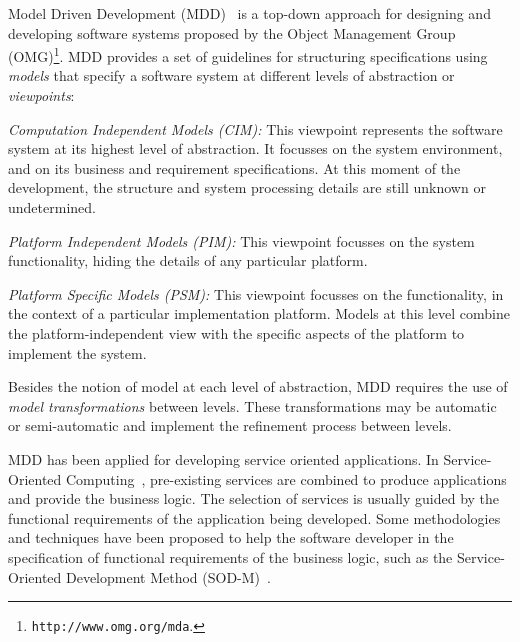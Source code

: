 Model Driven Development (MDD)~\cite{Favre06arigorous} is a top-down approach for  designing and developing software systems 
proposed by the Object Management Group
(OMG)\footnote{\texttt{http://www.omg.org/mda}.}. 
MDD provides a set of
guidelines for  structuring  specifications using
 \textit{models} that specify a software system at different levels of abstraction or \textit{viewpoints}: 

\noindent \textit{Computation Independent Models (CIM):} This viewpoint represents the software system at its highest level of abstraction. It focusses on the system
environment, and on its business and requirement specifications. 
At this moment of the development, the structure and system processing details are still unknown or undetermined. 

\noindent \textit{Platform Independent Models (PIM):} This viewpoint focusses on the system functionality, hiding the details of any particular platform. 

\noindent \textit{Platform Specific Models (PSM):} This viewpoint focusses on the functionality, in the context of a particular implementation platform.
Models at this level combine the platform-independent view with the specific aspects of the platform to implement the system.  

Besides the notion of model at each level of abstraction, MDD requires the use of \textit{model transformations} between levels.
These transformations may be automatic or semi-automatic and implement the refinement process between levels. 

MDD has been applied for developing service oriented applications.
In Service-Oriented Computing~\cite{scube2010book}, pre-existing services are
combined to produce applications and provide the business logic. The selection of services is usually guided by the functional requirements of the application being developed. 
Some methodologies and techniques have been proposed to help the software
developer in the specification of functional requirements of the business logic,
such as the Service-Oriented Development Method
(SOD-M)~\cite{decastro1}. 

